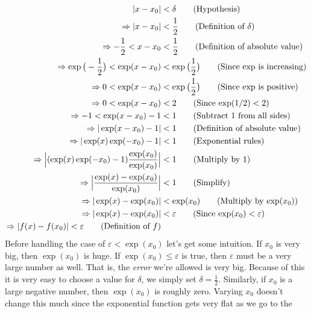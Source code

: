 \documentclass{article}
\theoremstyle{normal}
\theoremstyle{plain}
\begin{document}
    \begin{align}
        |x-x_{0}|&<\delta
        \tag{Hypothesis}\\
        \Rightarrow
        |x-x_{0}|&<\frac{1}{2}
        \tag{Definition of $\delta$}\\
        \Rightarrow
        -\frac{1}{2}<x-x_{0}&<\frac{1}{2}
        \tag{Definition of absolute value}\\
        \Rightarrow
        \exp\big(-\frac{1}{2}\big)
        <\exp(x-x_{0})
        &<\exp\big(\frac{1}{2}\big)
        \tag{Since $\exp$ is increasing}\\
        \Rightarrow
        0<\exp(x-x_{0})&<\exp\big(\frac{1}{2}\big)
        \tag{Since $\exp$ is positive}\\
        \Rightarrow
        0<\exp(x-x_{0})&<2
        \tag{Since $\exp(1/2)<2$}\\
        \Rightarrow
        -1<\exp(x-x_{0})-1&<1
        \tag{Subtract 1 from all sides}\\
        \Rightarrow
        |\exp(x-x_{0})-1|&<1
        \tag{Definition of absolute value}\\
        \Rightarrow
        |\exp(x)\exp(-x_{0})-1|&<1
        \tag{Exponential rules}\\
        \Rightarrow
        \Big|(\exp(x)\exp(-x_{0})-1)\frac{\exp(x_{0})}{\exp(x_{0})}\Big|&<1
        \tag{Multiply by 1}\\
        \Rightarrow
        \Big|\frac{\exp(x)-\exp(x_{0})}{\exp(x_{0})}\Big|&<1
        \tag{Simplify}\\
        \Rightarrow
        |\exp(x)-\exp(x_{0})|&<\exp(x_{0})
        \tag{Multiply by $\exp(x_{0})$}\\
        \Rightarrow
        |\exp(x)-\exp(x_{0})|&<\varepsilon
        \tag{Since $\exp(x_{0})<\varepsilon$}\\
        \Rightarrow
        |f(x)-f(x_{0})|<\varepsilon
        \tag{Definition of $f$}
    \end{align}
    Before handling the case of $\varepsilon<\exp(x_{0})$ let's get some
    intuition. If $x_{0}$ is very big, then $\exp(x_{0})$ is huge.
    If $\exp(x_{0})\leq\varepsilon$ is true, then $\varepsilon$ must be a
    very large number as well. That is, the \textit{error} we're allowed is
    very big. Because of this it is very easy to choose a value for $\delta$,
    we simply set $\delta=\frac{1}{2}$.
    Similarly, if $x_{0}$ is a large negative
    number, then $\exp(x_{0})$ is roughly zero. Varying $x_{0}$ doesn't change
    this much since the exponential function gets very flat as we go to the
\end{document}

